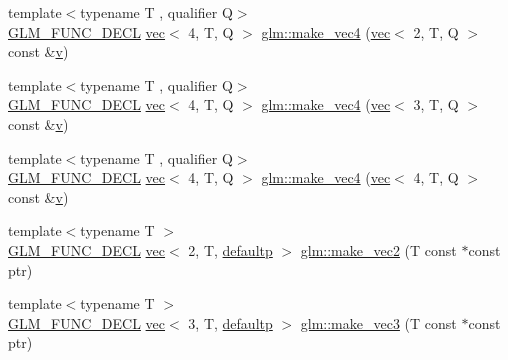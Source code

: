 \begin{DoxyCompactItemize}
\item 
{\footnotesize template$<$typename T , qualifier Q$>$ }\\\mbox{\hyperlink{setup_8hpp_ab2d052de21a70539923e9bcbf6e83a51}{G\+L\+M\+\_\+\+F\+U\+N\+C\+\_\+\+D\+E\+CL}} \mbox{\hyperlink{structglm_1_1vec}{vec}}$<$ 4, T, Q $>$ \mbox{\hyperlink{group__gtc__type__ptr_gaa9bd116caf28196fd1cf00b278286fa7}{glm\+::make\+\_\+vec4}} (\mbox{\hyperlink{structglm_1_1vec}{vec}}$<$ 2, T, Q $>$ const \&\mbox{\hyperlink{_s_d_l__opengl_8h_a10a82eabcb59d2fcd74acee063775f90}{v}})
\item 
{\footnotesize template$<$typename T , qualifier Q$>$ }\\\mbox{\hyperlink{setup_8hpp_ab2d052de21a70539923e9bcbf6e83a51}{G\+L\+M\+\_\+\+F\+U\+N\+C\+\_\+\+D\+E\+CL}} \mbox{\hyperlink{structglm_1_1vec}{vec}}$<$ 4, T, Q $>$ \mbox{\hyperlink{group__gtc__type__ptr_ga4036328ba4702c74cbdfad1fc03d1b8f}{glm\+::make\+\_\+vec4}} (\mbox{\hyperlink{structglm_1_1vec}{vec}}$<$ 3, T, Q $>$ const \&\mbox{\hyperlink{_s_d_l__opengl_8h_a10a82eabcb59d2fcd74acee063775f90}{v}})
\item 
{\footnotesize template$<$typename T , qualifier Q$>$ }\\\mbox{\hyperlink{setup_8hpp_ab2d052de21a70539923e9bcbf6e83a51}{G\+L\+M\+\_\+\+F\+U\+N\+C\+\_\+\+D\+E\+CL}} \mbox{\hyperlink{structglm_1_1vec}{vec}}$<$ 4, T, Q $>$ \mbox{\hyperlink{group__gtc__type__ptr_gaa95cb15732f708f613e65a0578895ae5}{glm\+::make\+\_\+vec4}} (\mbox{\hyperlink{structglm_1_1vec}{vec}}$<$ 4, T, Q $>$ const \&\mbox{\hyperlink{_s_d_l__opengl_8h_a10a82eabcb59d2fcd74acee063775f90}{v}})
\item 
{\footnotesize template$<$typename T $>$ }\\\mbox{\hyperlink{setup_8hpp_ab2d052de21a70539923e9bcbf6e83a51}{G\+L\+M\+\_\+\+F\+U\+N\+C\+\_\+\+D\+E\+CL}} \mbox{\hyperlink{structglm_1_1vec}{vec}}$<$ 2, T, \mbox{\hyperlink{namespaceglm_a36ed105b07c7746804d7fdc7cc90ff25a9d21ccd8b5a009ec7eb7677befc3bf51}{defaultp}} $>$ \mbox{\hyperlink{group__gtc__type__ptr_ga81253cf7b0ebfbb1e70540c5774e6824}{glm\+::make\+\_\+vec2}} (T const $\ast$const ptr)
\item 
{\footnotesize template$<$typename T $>$ }\\\mbox{\hyperlink{setup_8hpp_ab2d052de21a70539923e9bcbf6e83a51}{G\+L\+M\+\_\+\+F\+U\+N\+C\+\_\+\+D\+E\+CL}} \mbox{\hyperlink{structglm_1_1vec}{vec}}$<$ 3, T, \mbox{\hyperlink{namespaceglm_a36ed105b07c7746804d7fdc7cc90ff25a9d21ccd8b5a009ec7eb7677befc3bf51}{defaultp}} $>$ \mbox{\hyperlink{group__gtc__type__ptr_gad9e0d36ff489cb30c65ad1fa40351651}{glm\+::make\+\_\+vec3}} (T const $\ast$const ptr)

\end{DoxyCompactItemize}
